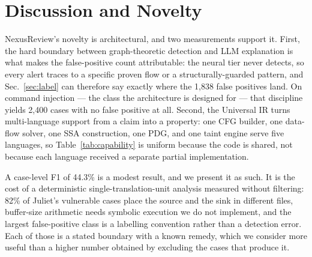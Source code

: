 \documentclass[10pt,conference]{IEEEtran}
\begin{document}
\section{Discussion and Novelty}
NexusReview's novelty is architectural, and two measurements support it.
First, the hard boundary between graph-theoretic detection and LLM
explanation is what makes the false-positive count attributable: the neural
tier never detects, so every alert traces to a specific proven flow or a
structurally-guarded pattern, and Sec.~\ref{sec:label} can therefore say
exactly where the 1{,}838 false positives land. On command injection --- the
class the architecture is designed for --- that discipline yields 2{,}400
cases with no false positive at all. Second, the Universal IR turns
multi-language support from a claim into a property: one CFG builder, one
data-flow solver, one SSA construction, one PDG, and one taint engine serve
five languages, so Table~\ref{tab:capability} is uniform because the code is
shared, not because each language received a separate partial implementation.

A case-level F1 of 44.3\% is a modest result, and we present it as such. It
is the cost of a deterministic single-translation-unit analysis measured
without filtering: 82\% of Juliet's vulnerable cases place the source and the
sink in different files, buffer-size arithmetic needs symbolic execution we
do not implement, and the largest false-positive class is a labelling
convention rather than a detection error. Each of those is a stated boundary
with a known remedy, which we consider more useful than a higher number
obtained by excluding the cases that produce it.

\end{document}
